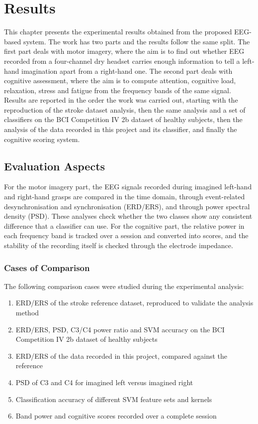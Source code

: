 \chapter{Results}

This chapter presents the experimental results obtained from the proposed EEG-based
system. The work has two parts and the results follow the same split. The first part deals
with motor imagery, where the aim is to find out whether EEG recorded from a four-channel
dry headset carries enough information to tell a left-hand imagination apart from a
right-hand one. The second part deals with cognitive assessment, where the aim is to
compute attention, cognitive load, relaxation, stress and fatigue from the frequency bands
of the same signal. Results are reported in the order the work was carried out, starting
with the reproduction of the stroke dataset analysis, then the same analysis and a set of
classifiers on the BCI Competition IV 2b dataset of healthy subjects, then the analysis of
the data recorded in this project and its classifier, and finally the cognitive scoring
system.

\section{Evaluation Aspects}

For the motor imagery part, the EEG signals recorded during imagined left-hand and
right-hand grasps are compared in the time domain, through event-related desynchronisation
and synchronisation (ERD/ERS), and through power spectral density (PSD). These analyses
check whether the two classes show any consistent difference that a classifier can use. For
the cognitive part, the relative power in each frequency band is tracked over a session and
converted into scores, and the stability of the recording itself is checked through the
electrode impedance.

\subsection{Cases of Comparison}

The following comparison cases were studied during the experimental analysis:

\begin{enumerate}
    \item ERD/ERS of the stroke reference dataset, reproduced to validate the analysis method
    \item ERD/ERS, PSD, C3/C4 power ratio and SVM accuracy on the BCI Competition IV 2b
          dataset of healthy subjects
    \item ERD/ERS of the data recorded in this project, compared against the reference
    \item PSD of C3 and C4 for imagined left versus imagined right
    \item Classification accuracy of different SVM feature sets and kernels
    \item Band power and cognitive scores recorded over a complete session
\end{enumerate}


